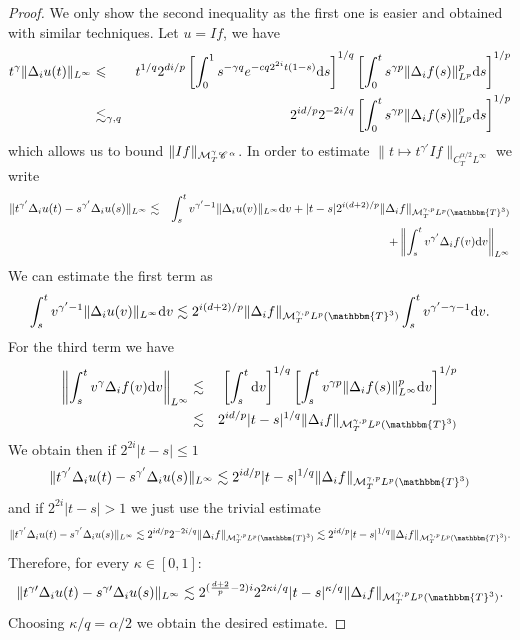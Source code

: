 \begin{appendices}
\begin{proof}
  We only show the second inequality as the first one is easier and obtained
  with similar techniques. Let $u = I f$, we have
  \begin{eqnarray*}
    t^{\gamma} \| \Delta_i u (t)\|_{L^{\infty}} & \leqslant & t^{1 / q} 2^{di
    / p} \left[ \int_0^1 s^{- \gamma q} e^{- cq 2^{2 i} t (1 - s)} \mathrm{d} s
    \right]^{1 / q} \left[ \int_0^t s^{\gamma p} \| \Delta_i f (s)\|_{L^p}^p
    \mathrm{d} s \right]^{1 / p}\\
    & \lesssim_{\gamma, q} & 2^{id / p} 2^{- 2 i / q}  \left[ \int_0^t
    s^{\gamma p} \| \Delta_i f (s)\|_{L^p}^p \mathrm{d} s \right]^{1 / p}
  \end{eqnarray*}
  which allows us to bound $\| I f \|_{\mathcal{M}^{\gamma}_T \mathscr{C} \hspace{.1em}^{\alpha}}$.
  In order to estimate $\| t \mapsto t^{\gamma'} I f \|_{C^{\alpha / 2}_T
  L^{\infty}}$ we write
  \begin{eqnarray*}
    \|t^{\gamma'} \Delta_i u (t) - s^{\gamma'} \Delta_i u (s)\|_{L^{\infty}} &
    \lesssim & \int_s^t v^{\gamma' - 1} \| \Delta_i u (v) \|_{L^{\infty}}
    \mathd v + | t - s | 2^{i (d + 2) / p} \| \Delta_i f
    \|_{\mathcal{M}^{\gamma, p}_T L^p (\mathbbm{T}^3)}\\
    &  & + \left\| \int_s^t v^{\gamma'} \Delta_i f (v) \mathd v
    \right\|_{L^{\infty}}
  \end{eqnarray*}
  We can estimate the first term as
  \[ \int_s^t v^{\gamma' - 1} \| \Delta_i u (v) \|_{L^{\infty}} \mathd v
     \lesssim 2^{i (d + 2) / p} \| \Delta_i f \|_{\mathcal{M}^{\gamma, p}_T
     L^p (\mathbbm{T}^3)} \int_s^t v^{\gamma' - \gamma - 1} \mathd v. \]
  For the third term we have
  \begin{eqnarray*}
    \left\| \int_s^t v^{\gamma} \Delta_i f (v) \mathd v \right\|_{L^{\infty}}
    & \lesssim & \left[ \int_s^t \mathd v \right]^{1 / q} \left[ \int_s^t
    v^{\gamma p} \| \Delta_i f (s)\|_{L^{\infty}}^p \mathd v \right]^{1 / p}\\
    & \lesssim & 2^{id / p}  |t - s|^{1 / q}  \| \Delta_i f
    \|_{\mathcal{M}^{\gamma, p}_T L^p (\mathbbm{T}^3)}
  \end{eqnarray*}
  We obtain then if $2^{2 i} | t - s | \leqslant 1$
  \[ \|t^{\gamma'} \Delta_i u (t) - s^{\gamma'} \Delta_i u (s)\|_{L^{\infty}}
     \lesssim 2^{id / p} | t - s |^{1 / q} \| \Delta_i f
     \|_{\mathcal{M}^{\gamma, p}_T L^p (\mathbbm{T}^3)} \]
  and if $2^{2 i} | t - s | > 1$ we just use the trivial estimate
  \[ \|t^{\gamma'} \Delta_i u (t) - s^{\gamma'} \Delta_i u (s)\|_{L^{\infty}}
     \lesssim 2^{id / p} 2^{- 2 i / q}  \| \Delta_i f \|_{\mathcal{M}^{\gamma,
     p}_T L^p (\mathbbm{T}^3)} \lesssim 2^{id / p} | t - s |^{1 / q} \|
     \Delta_i f \|_{\mathcal{M}^{\gamma, p}_T L^p (\mathbbm{T}^3)} . \]
  Therefore, for every $\kappa \in [0, 1]$:
  \[ \|t^{\gamma \prime} \Delta_i u (t) - s^{\gamma \prime} \Delta_i u
     (s)\|_{L^{\infty}} \lesssim 2^{(\frac{d + 2}{p} - 2) i} 2^{2 \kappa i /
     q}  |t - s|^{\kappa / q}  \| \Delta_i f \|_{\mathcal{M}^{\gamma, p}_T L^p
     (\mathbbm{T}^3)} . \]
  Choosing $\kappa / q = \alpha / 2$ we obtain the desired estimate.
\end{proof}


\end{appendices}
